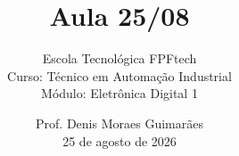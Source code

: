 
\title{Aula 25/08}

\subtitle{
\vspace{1.0cm}
Escola Tecnológica FPFtech\\
\vspace{0.5cm}
Curso: Técnico em Automação Industrial\\
\vspace{0.5cm}
Módulo: Eletrônica Digital 1
\vspace{1.0cm}
}

\author{
Prof. Denis Moraes Guimarães\\
\small 25 de agosto de 2026
}

\date{}